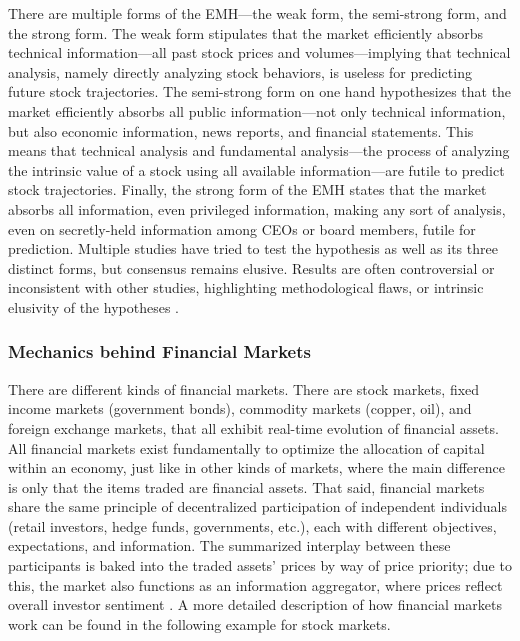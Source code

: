 \documentclass[stu,floatsintext]{apa7}
\begin{document}
There are multiple forms of the EMH—the weak form, the semi-strong form, and the strong form. The weak form stipulates that the market efficiently absorbs technical information—all past stock prices and volumes—implying that technical analysis, namely directly analyzing stock behaviors, is useless for predicting future stock trajectories. The semi-strong form on one hand hypothesizes that the market efficiently absorbs all public information—not only technical information, but also economic information, news reports, and financial statements. This means that technical analysis and fundamental analysis—the process of analyzing the intrinsic value of a stock using all available information—are futile to predict stock trajectories. Finally, the strong form of the EMH states that the market absorbs all information, even privileged information, making any sort of analysis, even on secretly-held information among CEOs or board members, futile for prediction. Multiple studies have tried to test the hypothesis as well as its three distinct forms, but consensus remains elusive. Results are often controversial or inconsistent with other studies, highlighting methodological flaws, or intrinsic elusivity of the hypotheses \parencite{titan2015efficient}.

\subsubsection{Mechanics behind Financial Markets}

There are different kinds of financial markets. There are stock markets, fixed income markets (government bonds), commodity markets (copper, oil), and foreign exchange markets, that all exhibit real-time evolution of financial assets. All financial markets exist fundamentally to optimize the allocation of capital within an economy, just like in other kinds of markets, where the main difference is only that the items traded are financial assets. That said, financial markets share the same principle of decentralized participation of independent individuals (retail investors, hedge funds, governments, etc.), each with different objectives, expectations, and information. The summarized interplay between these participants is baked into the traded assets' prices by way of price priority; due to this, the market also functions as an information aggregator, where prices reflect overall investor sentiment \parencite{bodie2023investments}. A more detailed description of how financial markets work can be found in the following example for stock markets.
\end{document}

